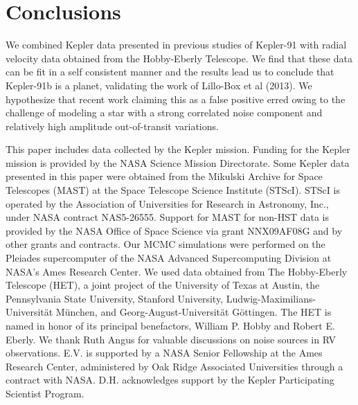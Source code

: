 \documentclass[apjl]{emulateapj}
\begin{document}
\section{Conclusions}
We combined Kepler data presented in previous studies of Kepler-91 with radial velocity data obtained from the Hobby-Eberly Telescope. We find that these data can be fit in a self consistent manner and the results lead us to conclude that Kepler-91b is a planet, validating the work of Lillo-Box et al (2013). We hypothesize that recent work claiming this as a false positive erred owing to the challenge of modeling a star with a strong correlated noise component and relatively high amplitude out-of-transit variations. 

\acknowledgments
This paper includes data collected by the Kepler mission. Funding for the Kepler mission is provided by the NASA Science Mission Directorate. Some Kepler data presented in this paper were obtained from the Mikulski Archive for Space Telescopes (MAST) at the Space Telescope Science Institute (STScI). STScI is operated by the Association of Universities for Research in Astronomy, Inc., under NASA contract NAS5-26555. Support for MAST for non-HST data is provided by the NASA Office of Space Science via grant NNX09AF08G and by other grants and contracts. Our MCMC simulations were performed on the Pleiades supercomputer of the NASA Advanced Supercomputing Division at NASA's Ames Research Center. We used data obtained from The Hobby-Eberly Telescope (HET), a joint project of the University of Texas at Austin, the Pennsylvania State University, Stanford University, Ludwig-Maximilians-Universit\"{a}t M\"{u}nchen, and Georg-August-Universit\"{a}t G\"{o}ttingen. The HET is named in honor of its principal benefactors, William P. Hobby and Robert E. Eberly. We thank Ruth Angus for valuable discussions on noise sources in RV observations. E.V. is supported by a NASA Senior Fellowship at the Ames Research Center, administered by Oak Ridge Associated Universities through a contract with NASA. D.H. acknowledges support by the Kepler Participating Scientist Program. 






\end{document}

